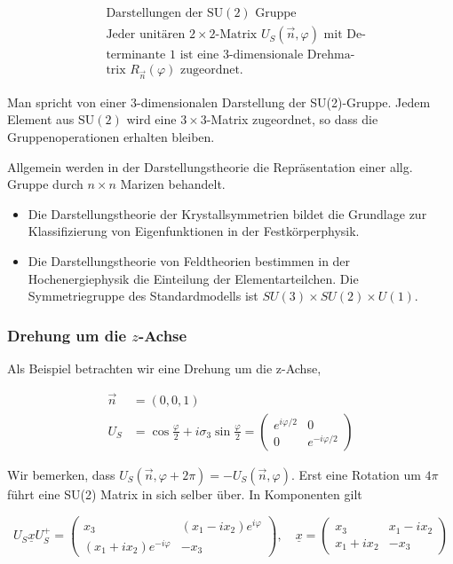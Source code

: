 \documentclass[10pt, letterpaper]{article}
\begin{document}
$$
\begin{aligned}
& \text { Darstellungen der } \mathrm{SU}(2) \text { Gruppe } \\
& \text { Jeder unitären } 2 \times 2 \text {-Matrix } U_{S}(\vec{n}, \varphi) \text { mit De- } \\
& \text { terminante } 1 \text { ist eine } 3 \text {-dimensionale Drehma- } \\
& \text { trix } R_{\vec{n}}(\varphi) \text { zugeordnet. }
\end{aligned}
$$

Man spricht von einer 3-dimensionalen Darstellung der SU(2)-Gruppe. Jedem Element aus $\mathrm{SU}(2)$ wird eine $3 \times 3$-Matrix zugeordnet, so dass die Gruppenoperationen erhalten bleiben.

Allgemein werden in der Darstellungstheorie die Repräsentation einer allg. Gruppe durch $n \times n$ Marizen behandelt.

\begin{itemize}
  \item Die Darstellungstheorie der Krystallsymmetrien bildet die Grundlage zur Klassifizierung von Eigenfunktionen in der Festkörperphysik.
  \item Die Darstellungstheorie von Feldtheorien bestimmen in der Hochenergiephysik die Einteilung der Elementarteilchen. Die Symmetriegruppe des Standardmodells ist $S U(3) \times S U(2) \times U(1)$.
\end{itemize}

\subsubsection*{Drehung um die $z$-Achse}
Als Beispiel betrachten wir eine Drehung um die z-Achse,

$$
\begin{aligned}
\vec{n} & =(0,0,1) \\
U_{S} & =\cos \frac{\varphi}{2}+i \sigma_{3} \sin \frac{\varphi}{2}=\left(\begin{array}{cc}
e^{i \varphi / 2} & 0 \\
0 & e^{-i \varphi / 2}
\end{array}\right)
\end{aligned}
$$

Wir bemerken, dass $U_{S}(\vec{n}, \varphi+2 \pi)=-U_{S}(\vec{n}, \varphi)$. Erst eine Rotation um $4 \pi$ führt eine SU(2) Matrix in sich selber über. In Komponenten gilt

$$
U_{S} \underline{x} U_{S}^{+}=\left(\begin{array}{cc}
x_{3} & \left(x_{1}-i x_{2}\right) e^{i \varphi} \\
\left(x_{1}+i x_{2}\right) e^{-i \varphi} & -x_{3}
\end{array}\right), \quad \underline{x}=\left(\begin{array}{cc}
x_{3} & x_{1}-i x_{2} \\
x_{1}+i x_{2} & -x_{3}
\end{array}\right)
$$
\end{document}
